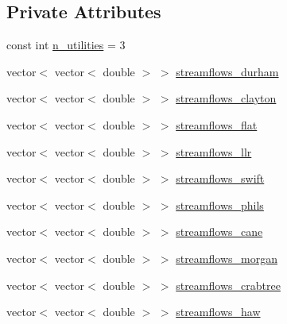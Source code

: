 \subsection*{Private Attributes}
\begin{DoxyCompactItemize}
\item 
const int \mbox{\hyperlink{classPaperTestProblem_af4990348248cc169eb2137003dbe2e00_af4990348248cc169eb2137003dbe2e00}{n\+\_\+utilities}} = 3
\item 
vector$<$ vector$<$ double $>$ $>$ \mbox{\hyperlink{classPaperTestProblem_a6169e129c59da20034c2f9be422d517f_a6169e129c59da20034c2f9be422d517f}{streamflows\+\_\+durham}}
\item 
vector$<$ vector$<$ double $>$ $>$ \mbox{\hyperlink{classPaperTestProblem_a4e7333f37fe66ba2cc893da6a63923a2_a4e7333f37fe66ba2cc893da6a63923a2}{streamflows\+\_\+clayton}}
\item 
vector$<$ vector$<$ double $>$ $>$ \mbox{\hyperlink{classPaperTestProblem_a64ec117093c48136883b8ece3842ebc4_a64ec117093c48136883b8ece3842ebc4}{streamflows\+\_\+flat}}
\item 
vector$<$ vector$<$ double $>$ $>$ \mbox{\hyperlink{classPaperTestProblem_ad9662a0ff669acb6b4fe37672dce1932_ad9662a0ff669acb6b4fe37672dce1932}{streamflows\+\_\+llr}}
\item 
vector$<$ vector$<$ double $>$ $>$ \mbox{\hyperlink{classPaperTestProblem_a6d22fc82ecff030315ffd8c4b464f239_a6d22fc82ecff030315ffd8c4b464f239}{streamflows\+\_\+swift}}
\item 
vector$<$ vector$<$ double $>$ $>$ \mbox{\hyperlink{classPaperTestProblem_aadc7191d1960cd52ee527196aabee985_aadc7191d1960cd52ee527196aabee985}{streamflows\+\_\+phils}}
\item 
vector$<$ vector$<$ double $>$ $>$ \mbox{\hyperlink{classPaperTestProblem_aacac987101625859b4d6192bffcb08a2_aacac987101625859b4d6192bffcb08a2}{streamflows\+\_\+cane}}
\item 
vector$<$ vector$<$ double $>$ $>$ \mbox{\hyperlink{classPaperTestProblem_a838a01bac4428be605162a7deab1cfff_a838a01bac4428be605162a7deab1cfff}{streamflows\+\_\+morgan}}
\item 
vector$<$ vector$<$ double $>$ $>$ \mbox{\hyperlink{classPaperTestProblem_ab329f309fe8b95a1cfddcbcb6f41cd75_ab329f309fe8b95a1cfddcbcb6f41cd75}{streamflows\+\_\+crabtree}}
\item 
vector$<$ vector$<$ double $>$ $>$ \mbox{\hyperlink{classPaperTestProblem_a7d96d2ddb089e51068380c1aa0e691e8_a7d96d2ddb089e51068380c1aa0e691e8}{streamflows\+\_\+haw}}
\item 

\end{DoxyCompactItemize}
